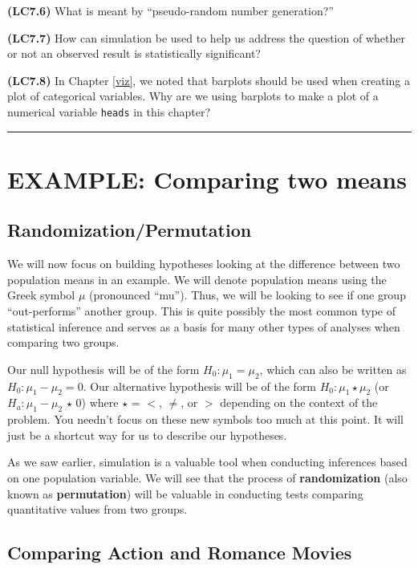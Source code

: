 \documentclass[]{tufte-book}
\let\oldrule=\rule
\renewcommand{\rule}[1]{\oldrule{\linewidth}}
\begin{document}
\textbf{(LC7.6)} What is meant by ``pseudo-random number generation?''

\textbf{(LC7.7)} How can simulation be used to help us address the
question of whether or not an observed result is statistically
significant?

\textbf{(LC7.8)} In Chapter \ref{viz}, we noted that barplots should be
used when creating a plot of categorical variables. Why are we using
barplots to make a plot of a numerical variable \texttt{heads} in this
chapter?

\begin{center}\rule{0.5\linewidth}{\linethickness}\end{center}

\section{EXAMPLE: Comparing two
means}\label{example-comparing-two-means}

\subsection{Randomization/Permutation}\label{randomizationpermutation}

We will now focus on building hypotheses looking at the difference
between two population means in an example. We will denote population
means using the Greek symbol \(\mu\) (pronounced ``mu''). Thus, we will
be looking to see if one group ``out-performs'' another group. This is
quite possibly the most common type of statistical inference and serves
as a basis for many other types of analyses when comparing two groups.

Our null hypothesis will be of the form \(H_0: \mu_1 = \mu_2\), which
can also be written as \(H_0: \mu_1 - \mu_2 = 0\). Our alternative
hypothesis will be of the form \(H_0: \mu_1 \star \mu_2\) (or
\(H_a: \mu_1 - \mu_2 \, \star \, 0\)) where \(\star\) = \(<\), \(\ne\),
or \(>\) depending on the context of the problem. You needn't focus on
these new symbols too much at this point. It will just be a shortcut way
for us to describe our hypotheses.

As we saw earlier, simulation is a valuable tool when conducting
inferences based on one population variable. We will see that the
process of \textbf{randomization} (also known as \textbf{permutation})
will be valuable in conducting tests comparing quantitative values from
two groups.

\subsection{Comparing Action and Romance
Movies}\label{comparing-action-and-romance-movies}
\end{document}
